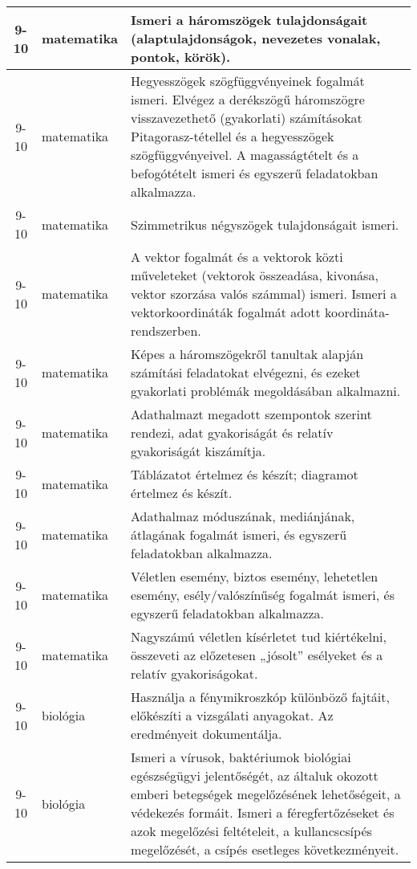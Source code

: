 \begin{small}
\begin{longtable}{c | p{2cm} |  p{11cm} }
              9-10 & matematika & Ismeri a háromszögek tulajdonságait (alaptulajdonságok, nevezetes vonalak, pontok, körök). \\ \hline
              9-10 & matematika & Hegyesszögek szögfüggvényeinek fogalmát ismeri.
Elvégez a derékszögű háromszögre visszavezethető (gyakorlati) számításokat Pitagorasz-tétellel és a hegyesszögek szögfüggvényeivel. A magasságtételt és a befogótételt ismeri és egyszerű feladatokban alkalmazza. \\ \hline
              9-10 & matematika & Szimmetrikus négyszögek tulajdonságait ismeri. \\ \hline
              9-10 & matematika & A vektor fogalmát és a vektorok közti műveleteket (vektorok összeadása, kivonása, vektor szorzása valós számmal) ismeri. Ismeri a vektorkoordináták fogalmát adott koordináta-rendszerben. \\ \hline
              9-10 & matematika & Képes a háromszögekről tanultak alapján számítási feladatokat elvégezni, és ezeket gyakorlati problémák megoldásában alkalmazni. \\ \hline
              9-10 & matematika & Adathalmazt megadott szempontok szerint rendezi, adat gyakoriságát és relatív gyakoriságát kiszámítja. \\ \hline
              9-10 & matematika & Táblázatot értelmez és készít; diagramot értelmez és készít. \\ \hline
              9-10 & matematika & Adathalmaz móduszának, mediánjának, átlagának fogalmát ismeri, és egyszerű feladatokban alkalmazza. \\ \hline
              9-10 & matematika & Véletlen esemény, biztos esemény, lehetetlen esemény, esély/valószínűség fogalmát ismeri, és egyszerű feladatokban alkalmazza. \\ \hline
              9-10 & matematika & Nagyszámú véletlen kísérletet tud kiértékelni, összeveti az előzetesen „jósolt” esélyeket és a relatív gyakoriságokat. \\ \hline
              9-10 & biológia & Használja a fénymikroszkóp különböző fajtáit, előkészíti a vizsgálati anyagokat. Az eredményeit dokumentálja. \\ \hline
              9-10 & biológia & Ismeri a vírusok, baktériumok biológiai egészségügyi jelentőségét, az általuk okozott emberi betegségek megelőzésének lehetőségeit, a védekezés formáit. Ismeri a féregfertőzéseket és azok megelőzési feltételeit, a kullancscsípés megelőzését, a csípés esetleges következményeit. \\ \hline

\end{longtable}
\end{small}
